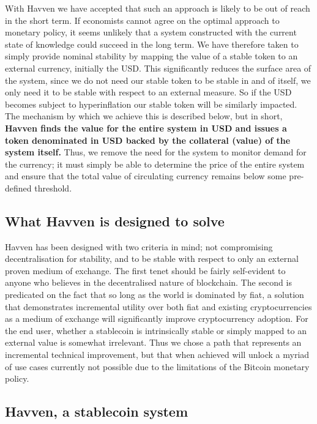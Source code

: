 \noindent With Havven we have accepted that such an approach is likely to be out of reach in the short term. If economists cannot agree on the optimal approach to monetary policy, it seems unlikely that a system constructed with the current state of knowledge could succeed in the long term. We have therefore taken to simply provide nominal stability by mapping the value of a stable token to an external currency, initially the USD. This significantly reduces the surface area of the system, since we do not need our stable token to be stable in and of itself, we only need it to be stable with respect to an external measure. So if the USD becomes subject to hyperinflation our stable token will be similarly impacted. The mechanism by which we achieve this is described below, but in short, \textbf{Havven finds the value for the entire system in USD and issues a token denominated in USD backed by the collateral (value) of the system itself.} Thus, we remove the need for the system to monitor demand for the currency; it must simply be able to determine the price of the entire system and ensure that the total value of circulating currency remains below some pre-defined threshold. \\

\subsection{What Havven is designed to solve}

\noindent Havven has been designed with two criteria in mind; not compromising decentralisation for stability, and to be stable with respect to only an external proven medium of exchange. The first tenet should be fairly self-evident to anyone who believes in the decentralised nature of blockchain. The second is predicated on the fact that so long as the world is dominated by fiat, a solution that demonstrates incremental utility over both fiat and existing cryptocurrencies as a medium of exchange will significantly improve cryptocurrency adoption. For the end user, whether a stablecoin is intrinsically stable or simply mapped to an external value is somewhat irrelevant. Thus we chose a path that represents an incremental technical improvement, but that when achieved will unlock a myriad of use cases currently not possible due to the limitations of the Bitcoin monetary policy. \\

\subsection{Havven, a stablecoin system}

